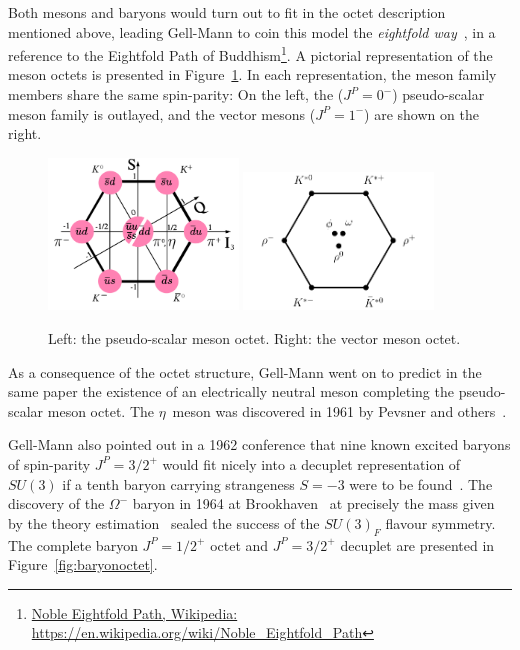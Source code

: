  Both mesons and baryons would turn out to fit in the octet
description mentioned above, leading Gell-Mann to coin this model the
\textit{eightfold way}~\cite{eightfoldway}, in a reference to the
Eightfold Path of
Buddhism\footnote{\href{https://en.wikipedia.org/wiki/Noble_Eightfold_Path}{Noble
    Eightfold Path, Wikipedia: https://en.wikipedia.org/wiki/Noble\_Eightfold\_Path}}. A pictorial
representation of the meson octets is presented in
Figure~\ref{fig:mesonoctet}. In each representation, the meson family members share the
same spin-parity: On the left, the ($J^P = 0^-$) pseudo-scalar meson
family is outlayed, and the vector mesons ($J^P = 1^-$) are shown on
the right.

\begin{figure}[h]
\begin{center}
  \includegraphics[width=0.45\textwidth]{Chapters/pQCD/Meson-octet_0.png}
  \includegraphics[width=0.45\textwidth]{Chapters/pQCD/Meson-octet_1.png}
 \caption{Left: the pseudo-scalar meson octet. Right: the vector meson octet.}
 \label{fig:mesonoctet}
\end{center}
\end{figure}

As a consequence of the octet structure, Gell-Mann went on to predict in the same paper the existence of
an electrically neutral meson completing the pseudo-scalar meson octet. The $\eta$~meson
was discovered in 1961 by Pevsner and others~\cite{PhysRevLett.7.421}. 

Gell-Mann also pointed out in a 1962 conference that nine known excited
baryons of spin-parity $J^P = 3/2^{+}$ would fit nicely into a decuplet representation of
$SU(3)$ if a tenth baryon carrying strangeness $S=-3$ were to be
found~\cite{1962_GM_omega}. The discovery of the $\Omega^{-}$ baryon in 1964 at
Brookhaven~\cite{omegabaryon} at precisely the mass given by the
theory estimation~\cite{GM_omega,Okubo} sealed the success of the
$SU(3)_F$ flavour symmetry. The complete baryon $J^P = 1/2^{+}$ octet
and $J^P = 3/2^{+}$ decuplet are presented in Figure~\ref{fig:baryonoctet}.

